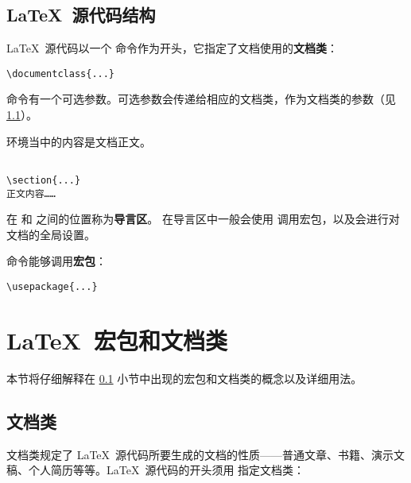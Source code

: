 \subsection{\LaTeX\ 源代码结构}\label{subsec:struct}

\LaTeX\ 源代码以一个  命令作为开头，它指定了文档使用的\textbf{文档类}：
\begin{verbatim}
\documentclass{...}
\end{verbatim}
 命令有一个可选参数。可选参数会传递给相应的文档类，作为文档类的参数（见 \ref{subsec:classes}）。

 环境当中的内容是文档正文。
\begin{verbatim}

\section{...}
正文内容……

\end{verbatim}

在  和  之间的位置称为\textbf{导言区}。
在导言区中一般会使用  调用宏包，以及会进行对文档的全局设置。

 命令能够调用\textbf{宏包}：
\begin{verbatim}
\usepackage{...}
\end{verbatim}

\section{\LaTeX\ 宏包和文档类}\label{sec:latex-pkgs}

本节将仔细解释在 \ref{subsec:struct} 小节中出现的宏包和文档类的概念以及详细用法。

\subsection{文档类}\label{subsec:classes}

文档类规定了 \LaTeX\ 源代码所要生成的文档的性质——普通文章、书籍、演示文稿、个人简历等等。\LaTeX\ 源代码的开头须用
指定文档类：
\begin{command}
\end{command}

